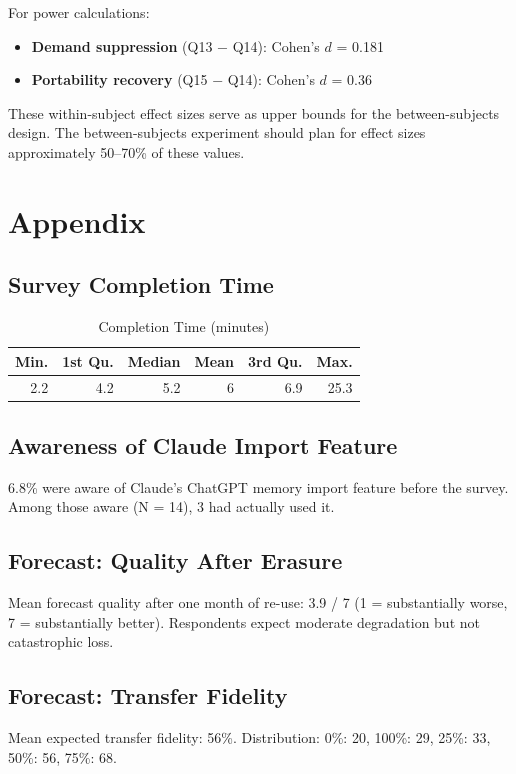 \documentclass[
]{article}
\providecommand{\tightlist}{%
  \setlength{\itemsep}{0pt}\setlength{\parskip}{0pt}}
\begin{document}
For power calculations:

\begin{itemize}
\tightlist
\item
  \textbf{Demand suppression} (Q13 \(-\) Q14): Cohen's \(d\) = 0.181
\item
  \textbf{Portability recovery} (Q15 \(-\) Q14): Cohen's \(d\) = 0.36
\end{itemize}

These within-subject effect sizes serve as upper bounds for the
between-subjects design. The between-subjects experiment should plan for
effect sizes approximately 50--70\% of these values.

\newpage

\section{Appendix}\label{appendix}

\subsection{Survey Completion Time}\label{survey-completion-time}

\begin{longtable}[t]{rrrrrr}
\caption{\label{tab:duration}Completion Time (minutes)}\\
\toprule
Min. & 1st Qu. & Median & Mean & 3rd Qu. & Max.\\
\midrule
2.2 & 4.2 & 5.2 & 6 & 6.9 & 25.3\\
\bottomrule
\end{longtable}

\subsection{Awareness of Claude Import
Feature}\label{awareness-of-claude-import-feature}

6.8\% were aware of Claude's ChatGPT memory import feature before the
survey. Among those aware (N = 14), 3 had actually used it.

\subsection{Forecast: Quality After
Erasure}\label{forecast-quality-after-erasure}

Mean forecast quality after one month of re-use: 3.9 / 7 (1 =
substantially worse, 7 = substantially better). Respondents expect
moderate degradation but not catastrophic loss.

\subsection{Forecast: Transfer
Fidelity}\label{forecast-transfer-fidelity}

Mean expected transfer fidelity: 56\%. Distribution: 0\%: 20, 100\%: 29,
25\%: 33, 50\%: 56, 75\%: 68.
\end{document}
